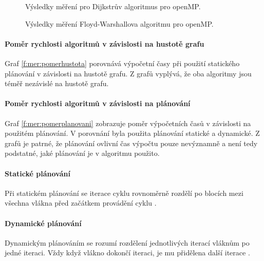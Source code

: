 \begin{figure}
    \centering
    \caption{Výsledky měření pro Dijkstrův algoritmus pro openMP.}
    \label{f:omp:vysledky:dijkstra}
\end{figure}

\begin{figure}
    \centering
    \caption{Výsledky měření Floyd-Warshallova algoritmu pro openMP.}
    \label{f:omp:vysledky:fw}
\end{figure}

\paragraph{Poměr rychlosti algoritmů v závislosti na hustotě grafu}
Graf \ref{f:mer:pomerhustota} porovnává výpočetní časy při použití statického plánování v závislosti na hustotě grafu. Z grafů vyplývá, že oba algoritmy jsou téměř nezávislé na hustotě grafu.

\paragraph{Poměr rychlosti algoritmů v závislosti na plánování}
Graf \ref{f:mer:pomerplanovani} zobrazuje poměr výpočetních časů v závislosti na použitém plánování.
V po\-rov\-ná\-ní byla použita plánování statické a dynamické. Z grafů je patrné, že plánování ovlivní čas výpočtu pouze nevýznamně a není tedy podstatné, jaké plánování je v algoritmu použito.
\paragraph{Statické plánování}
Při statickém plánování se iterace cyklu rovnoměrně rozdělí po blocích mezi všechna vlákna před začátkem provádění cyklu \cite{w:omp}.
\paragraph{Dynamické plánování}
Dynamickým plánováním se rozumí rozdělení jednotlivých iterací vláknům po jedné iteraci. Vždy když vlákno dokončí iteraci, je mu přidělena další iterace \cite{w:omp}.

